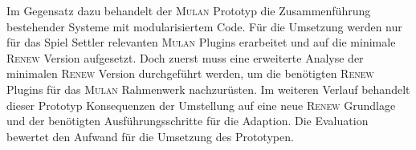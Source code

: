 	Im Gegensatz dazu behandelt der \textsc{Mulan} Prototyp die Zusammenführung bestehender Systeme mit modularisiertem Code. Für die Umsetzung werden nur für das Spiel Settler relevanten \textsc{Mulan} Plugins erarbeitet und auf die minimale \textsc{Renew} Version aufgesetzt. Doch zuerst muss eine erweiterte Analyse der minimalen \textsc{Renew} Version durchgeführt werden, um die benötigten \textsc{Renew} Plugins für das \textsc{Mulan} Rahmenwerk nachzurüsten. Im weiteren Verlauf behandelt dieser Prototyp Konsequenzen der Umstellung auf eine neue \textsc{Renew} Grundlage und der benötigten Ausführungsschritte für die Adaption. Die Evaluation bewertet den Aufwand für die Umsetzung des Prototypen. 






